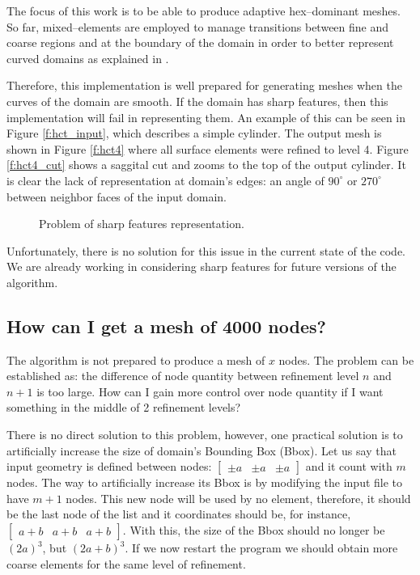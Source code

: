 \documentclass[10pt]{article}
\begin{document}
The focus of this work is to be able to produce adaptive hex--dominant meshes. So far, mixed--elements are employed to manage transitions between fine and coarse regions and at the boundary of the domain in order to better represent curved domains as explained in \cite{Lobos2013a}.

Therefore, this implementation is well prepared for generating meshes when the curves of the domain are smooth. If the domain has sharp features, then this implementation will fail in representing them.  An example of this can be seen in Figure \ref{f:hct_input}, which describes a simple cylinder. The output mesh is shown in Figure \ref{f:hct4} where all surface elements were refined to level 4. Figure \ref{f:hct4_cut} shows a saggital cut and zooms to the top of the output cylinder. It is clear the lack of representation at domain's edges: an angle of $90^\circ$ or $270^\circ$ between neighbor faces of the input domain.

\begin{figure}[htb]
\centering
\caption{Problem of sharp features representation.}
\label{f:hct}
\end{figure}

Unfortunately, there is no solution for this issue in the current state of the code. We are already working in considering sharp features for future versions of the algorithm.

\subsection{How can I get a mesh of 4000 nodes?}

The algorithm is not prepared to produce a mesh of $x$ nodes. The problem can be established as: the difference of node quantity between refinement level $n$ and $n+1$ is too large. How can I gain more control over node quantity if I want something in the middle of 2 refinement levels? 

There is no direct solution to this problem, however, one practical solution is to artificially increase the size of domain's Bounding Box (Bbox). Let us say that input geometry is defined between nodes: $\begin{bmatrix} \pm a & \pm a & \pm a \end{bmatrix}$ and it count with $m$ nodes. The way to artificially increase its Bbox is by modifying the input file to have $m+1$ nodes. This new node will be used by no element, therefore, it should be the last node of the list and it coordinates should be, for instance, $\begin{bmatrix} a+b & a+b & a+b \end{bmatrix}$. With this, the size of the Bbox should no longer be $(2a)^3$, but $(2a+b)^3$. If we now restart the program we should obtain more coarse elements for the same level of refinement.
\end{document}
